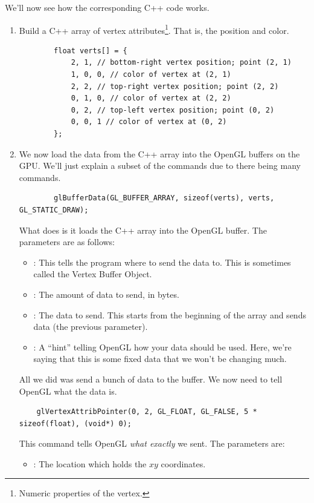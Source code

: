 \documentclass[letterpaper]{article}
\begin{document}
We'll now see how the corresponding C++ code works. 
\begin{enumerate}
    \item Build a C++ array of vertex attributes\footnote{Numeric properties of the vertex.}. That is, the position and color.
    \begin{verbatim}
        float verts[] = {
            2, 1, // bottom-right vertex position; point (2, 1) 
            1, 0, 0, // color of vertex at (2, 1) 
            2, 2, // top-right vertex position; point (2, 2)
            0, 1, 0, // color of vertex at (2, 2)
            0, 2, // top-left vertex position; point (0, 2)
            0, 0, 1 // color of vertex at (0, 2)
        };\end{verbatim}
    
    \item We now load the data from the C++ array into the OpenGL buffers on the GPU. We'll just explain a subset of the commands due to there being many commands.  
    \begin{verbatim}
        glBufferData(GL_BUFFER_ARRAY, sizeof(verts), verts, GL_STATIC_DRAW);\end{verbatim}
    What  does is it loads the C++ array into the OpenGL buffer. The parameters are as follows: 
    \begin{itemize}
        \item {}: This tells the program where to send the data to. This is sometimes called the Vertex Buffer Object. 
        \item {}: The amount of data to send, in bytes.
        \item {}: The data to send. This starts from the beginning of the array and sends  data (the previous parameter).
        \item {}: A ``hint'' telling OpenGL how your data should be used. Here, we're saying that this is some fixed data that we won't be changing much. 
    \end{itemize}
    All we did was send a bunch of data to the buffer. We now need to tell OpenGL what the data is. 
    \begin{verbatim}
    glVertexAttribPointer(0, 2, GL_FLOAT, GL_FALSE, 5 * sizeof(float), (void*) 0);\end{verbatim}
    This command tells OpenGL \emph{what exactly} we sent. The parameters are: 
    \begin{itemize}
        \item {}: The location which holds the $xy$ coordinates. 

\end{itemize}
\end{enumerate}
\end{document}
